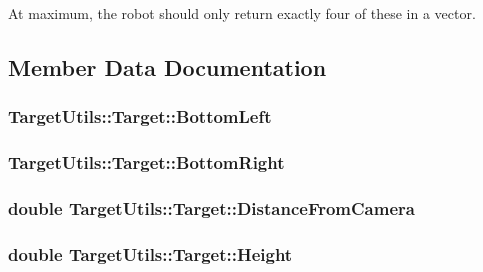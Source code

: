 \-At maximum, the robot should only return exactly four of these in a vector. 

\subsection{\-Member \-Data \-Documentation}
\hypertarget{struct_target_utils_1_1_target_a367f0f8f95b3c40ba319cf55110c481d}{
\subsubsection[{\-Bottom\-Left}]{ {\bf \-Target\-Utils\-::\-Target\-::\-Bottom\-Left}}}\label{struct_target_utils_1_1_target_a367f0f8f95b3c40ba319cf55110c481d}
\hypertarget{struct_target_utils_1_1_target_aaf8c42b6a6179d85d0a130b502aa37ec}{
\subsubsection[{\-Bottom\-Right}]{ {\bf \-Target\-Utils\-::\-Target\-::\-Bottom\-Right}}}\label{struct_target_utils_1_1_target_aaf8c42b6a6179d85d0a130b502aa37ec}
\hypertarget{struct_target_utils_1_1_target_a07d88d70507a213b8353a0a1384e60e1}{
\subsubsection[{\-Distance\-From\-Camera}]{\setlength{\rightskip}{0pt plus 5cm}double {\bf \-Target\-Utils\-::\-Target\-::\-Distance\-From\-Camera}}}\label{struct_target_utils_1_1_target_a07d88d70507a213b8353a0a1384e60e1}
\hypertarget{struct_target_utils_1_1_target_a8aed99c7df9c1f6081e28dfede4411e8}{
\subsubsection[{\-Height}]{\setlength{\rightskip}{0pt plus 5cm}double {\bf \-Target\-Utils\-::\-Target\-::\-Height}}}\label{struct_target_utils_1_1_target_a8aed99c7df9c1f6081e28dfede4411e8}
